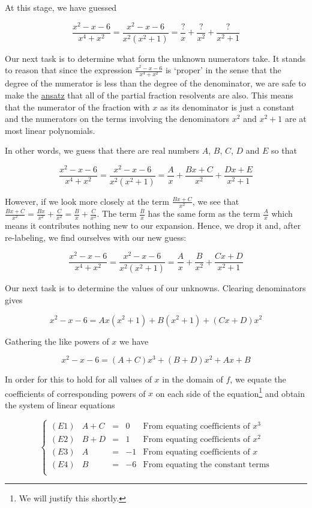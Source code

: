 \documentclass{ximera}
\begin{document}
At this stage, we have guessed

\[ \frac{x^2-x-6}{x^4+x^2} =  \frac{x^2-x-6}{x^2 \left(x^2+1\right)} = \frac{?}{x} + \frac{?}{x^2} + \frac{?}{x^2+1} \]

Our next task is to determine what form the unknown numerators take. It stands to reason that since the expression $\frac{x^2-x-6}{x^4+x^2}$ is `proper' in the sense that the degree of the numerator is less than the degree of the denominator, we are safe to make the \href{http://en.wikipedia.org/wiki/Ansatz}{\underline{ansatz}} that all of the partial fraction resolvents are also.  This means that the numerator of the fraction with $x$ as its denominator is just a constant and the numerators on the terms involving the denominators $x^2$ and $x^2+1$ are at most linear polynomials.  

In other words, we guess that there are real numbers $A$, $B$, $C$, $D$ and $E$ so that

\[ \frac{x^2-x-6}{x^4+x^2} =  \frac{x^2-x-6}{x^2 \left(x^2+1\right)} = \frac{A}{x} + \frac{Bx+C}{x^2} + \frac{Dx+E}{x^2+1} \]

However, if we look more closely at the term $\frac{Bx+C}{x^2}$, we see that $\frac{Bx+C}{x^2} = \frac{Bx}{x^2} + \frac{C}{x^2} = \frac{B}{x} + \frac{C}{x^2}$. The term $\frac{B}{x}$ has the same form as the term $\frac{A}{x}$ which means it contributes nothing new to our expansion.  Hence, we drop it and, after re-labeling, we find ourselves with our new guess:

\[ \frac{x^2-x-6}{x^4+x^2} =  \frac{x^2-x-6}{x^2 \left(x^2+1\right)} = \frac{A}{x} + \frac{B}{x^2} + \frac{Cx+D}{x^2+1} \] 

Our next task is to determine the values of our unknowns. Clearing denominators gives

\[x^2 - x- 6 = Ax\left(x^2+1\right) + B\left(x^2+1\right) + (Cx+D)x^2 \]

Gathering the like powers of $x$ we have

\[x^2 - x - 6 = (A+C)x^3+(B+D)x^2+Ax + B \]

In order for this to hold for all values of $x$ in the domain of $f$, we equate the coefficients of corresponding powers of $x$ on each side of the equation\footnote{We will justify this shortly.} and obtain the system of linear equations

\[ \left\{ \begin{array}{lrcrl} 
(E1) & A+C & = & 0 & \text{From equating coefficients of $x^{3}$} \\
(E2) & B+D & = & 1 & \text{From equating coefficients of $x^{2}$} \\
(E3) & A & = & -1 & \text{From equating coefficients of $x$} \\
(E4) & B & = & -6 & \text{From equating the constant terms} \\
\end{array} \right. \]
\end{document}
